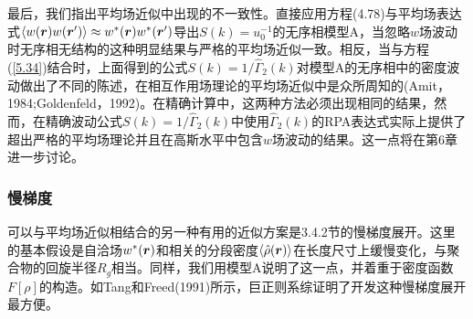 最后，我们指出平均场近似中出现的不一致性。直接应用方程(4.78)与平均场表达式$\left\langle w(\bm{r})w(\bm{r}')\right\rangle\approx w^*(\bm{r})w^*(\bm{r}')$导出$S(k)=u_0^{-1}$的无序相模型A，当忽略$w$场波动时无序相无结构的这种明显结果与严格的平均场近似一致。相反，当与方程(\ref{5.34})结合时，上面得到的公式$S(k)=1/\hat{\Gamma}_2(k)$对模型A的无序相中的密度波动做出了不同的陈述，在相互作用场理论的平均场近似中是众所周知的(Amit，1984;Goldenfeld，1992)。在精确计算中，这两种方法必须出现相同的结果，然而，在精确波动公式$S(k)=1/\hat{\Gamma}_2(k)$中使用$\hat{\Gamma}_2(k)$的RPA表达式实际上提供了超出严格的平均场理论并且在高斯水平中包含$w$场波动的结果。这一点将在第6章进一步讨论。
\subsubsection{慢梯度}
可以与平均场近似相结合的另一种有用的近似方案是3.4.2节的慢梯度展开。这里的基本假设是自洽场$w^*(\bm{r})$和相关的分段密度$\left\langle\hat{\rho}(\bm{r})\right\rangle$在长度尺寸上缓慢变化，与聚合物的回旋半径$R_g$相当。同样，我们用模型A说明了这一点，并着重于密度函数$F[\rho]$的构造。如Tang和Freed(1991)所示，巨正则系综证明了开发这种慢梯度展开最方便。

